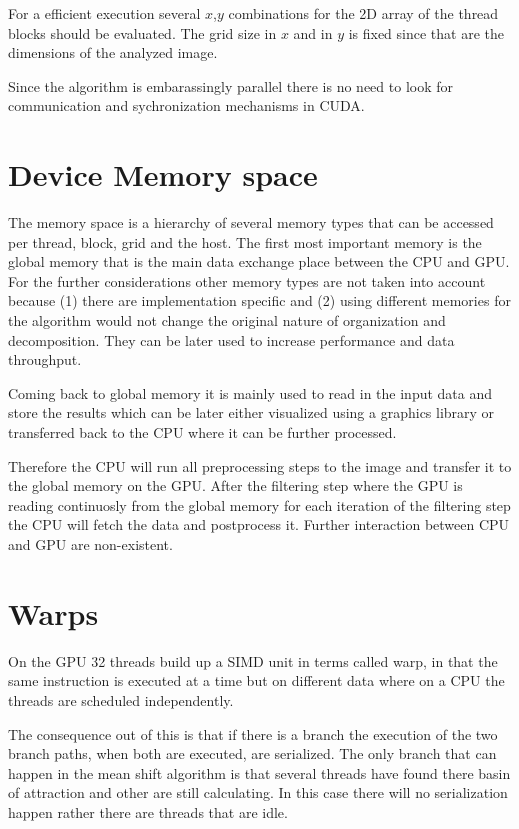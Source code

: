 For a efficient execution several $x$,$y$ combinations for the \gls{2D} array of the
thread blocks should be evaluated. The grid size in $x$ and in $y$ is fixed since
that are the dimensions of the analyzed image. 

Since the algorithm is embarassingly parallel there is no need to look for 
communication and sychronization mechanisms in \gls{CUDA}.

\section{Device Memory space} %
\label{sec:cuda_memory}

The memory space is a hierarchy of several memory types that can be accessed per
thread, block, grid and the host. The first most important memory is the global
memory that is the main data exchange place between the \gls{CPU} and \gls{GPU}. 
For the further considerations other memory types are not taken into account 
because (1) there are implementation specific and (2) using different memories
for the algorithm would not change the original nature of organization and
decomposition. They can be later used to increase performance and data throughput. 

Coming back to global memory it is mainly used to read in the input data and
store the results which can be later either visualized using a graphics library
or transferred back to the \gls{CPU} where it can be further processed. 

Therefore the \gls{CPU} will run all preprocessing steps to the image and
transfer it to the global memory on the \gls{GPU}. After the filtering step
where the \gls{GPU} is reading continuosly from the global memory for each
iteration of the filtering step the \gls{CPU} will fetch the data and
postprocess it. Further interaction between \gls{CPU} and \gls{GPU} are
non-existent.


\section{Warps} %
\label{sec:warps}

On the \gls{GPU} 32 threads build up a \gls{SIMD} unit in 
terms called warp, in that the same instruction is executed at a time but on
different data where on a \gls{CPU} the threads are scheduled independently. 

The consequence out of this is that if there is a branch the execution of the
two branch paths, when both are executed, are serialized. The only branch that
can happen in the mean shift algorithm is that several threads have found there
basin of attraction and other are still calculating. In this case there will no
serialization happen rather there are threads that are idle.

